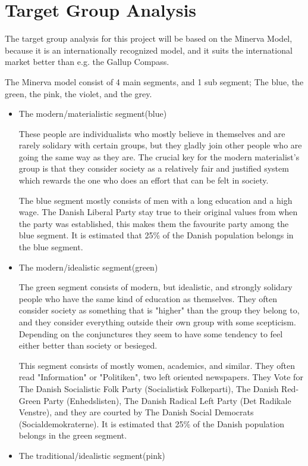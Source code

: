 \section{Target Group Analysis}
The target group analysis for this project will be based on the Minerva Model, because it is an internationally recognized model, and it suits the international market better than e.g. the Gallup Compass.

The Minerva model consist of 4 main segments, and 1 sub segment; The blue, the green, the pink, the violet, and the grey.
\begin{itemize}
\item The modern/materialistic segment(blue)

These people are individualists who mostly believe in themselves and are rarely solidary with certain groups, but they gladly join other people who are going the same way as they are. The crucial key for the modern materialist's group is that they consider society as a relatively fair and justified system which rewards the one who does an effort that can be felt in society.

The blue segment mostly consists of men with a long education and a high wage. The Danish Liberal Party stay true to their original values from when the party was established, this makes them the favourite party among the blue segment. It is estimated that 25\% of the Danish population belongs in the blue segment.

\item The modern/idealistic segment(green)

The green segment consists of modern, but idealistic, and strongly solidary people who have the same kind of education as themselves. They often consider society as something that is "higher" than the group they belong to, and they consider everything outside their own group with some scepticism. Depending on the conjunctures they seem to have some tendency to feel either better than society or besieged.

This segment consists of mostly women, academics, and similar. They often read "Information" or "Politiken", two left oriented newspapers. They Vote for The Danish Socialistic Folk Party (Socialistisk Folkeparti), The Danish Red-Green Party (Enhedslisten), The Danish Radical Left Party (Det Radikale Venstre), and they are courted by The Danish Social Democrats (Socialdemokraterne).
It is estimated that 25\% of the Danish population belongs in the green segment.

\item The traditional/idealistic segment(pink)


\end{itemize}
